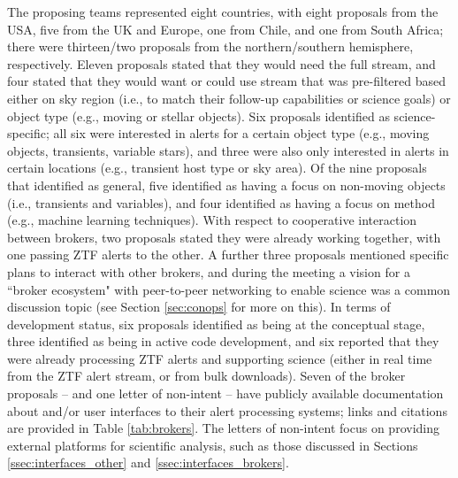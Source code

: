 The proposing teams represented eight countries, with eight proposals from the \gls{USA}, five from the \gls{UK} and Europe, one from Chile, and one from South Africa; there were thirteen/two proposals from the northern/southern hemisphere, respectively.
Eleven proposals stated that they would need the full stream, and four stated that they would want or could use stream that was pre-filtered based either on sky region (i.e., to match their follow-up capabilities or science goals) or object type (e.g., moving or stellar objects).
Six proposals identified as science-specific; all six were interested in alerts for a certain object type (e.g., moving objects, transients, variable stars), and three were also only interested in alerts in certain locations (e.g., \gls{transient} host type or sky area).
Of the nine proposals that identified as general, five identified as having a focus on non-moving objects (i.e., transients and variables), and four identified as having a focus on method (e.g., machine learning techniques).
With respect to cooperative interaction between brokers, two proposals stated they were already working together, with one passing \gls{ZTF} alerts to the other.
A further three proposals mentioned specific plans to interact with other brokers, and during the meeting a vision for a ``broker ecosystem" with peer-to-peer networking to enable science was a common discussion topic (see Section \ref{sec:conops} for more on this).
In terms of development status, six proposals identified as being at the conceptual stage, three identified as being in active code development, and six reported that they were already processing \gls{ZTF} alerts and supporting science (either in real time from the \gls{ZTF} alert stream, or from bulk downloads). 
Seven of the broker proposals -- and one letter of non-intent -- have publicly available documentation about and/or user interfaces to their alert processing systems; links and citations are provided in Table \ref{tab:brokers}.
The letters of non-intent focus on providing external platforms for scientific analysis, such as those discussed in Sections \ref{ssec:interfaces_other} and \ref{ssec:interfaces_brokers}.

